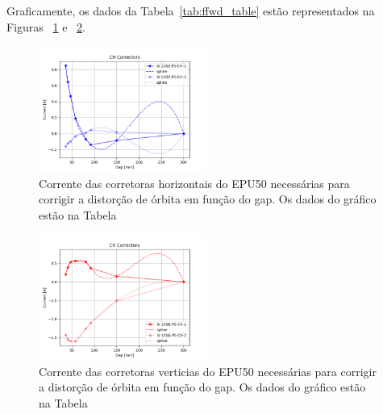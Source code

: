 \documentclass[a4paper,
               keeplastbox,   %
               ]{jacow}
\begin{document}
Graficamente, os dados da Tabela~\ref{tab:ffwd_table} estão representados na Figuras ~\ref{fig:ffwd_table_h} e ~\ref{fig:ffwd_table_v}.
\begin{figure}[!h]
    \centering
    \includegraphics[width=0.49\textwidth]{idff_horizontal.png}
    \caption{Corrente das corretoras horizontais do EPU50 necessárias para corrigir a distorção de órbita em função do gap. Os dados do gráfico estão na Tabela}
    \label{fig:ffwd_table_h}
\end{figure}
\begin{figure}[!h]
    \centering
    \includegraphics[width=0.49\textwidth]{idff_vertical.png}
    \caption{Corrente das corretoras verticias do EPU50 necessárias para corrigir a distorção de órbita em função do gap. Os dados do gráfico estão na Tabela}
    \label{fig:ffwd_table_v}
\end{figure}
\end{document}
